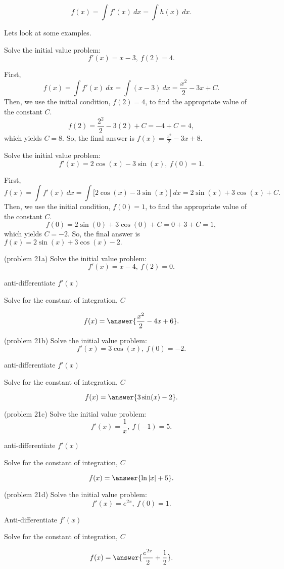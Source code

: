 \documentclass{ximera}
\begin{document}
\[f(x) = \int f'(x) \ dx = \int h(x) \ dx.\]

Lets look at some examples.

\begin{example}[example 20]
Solve the initial value problem:
\[f'(x) = x - 3, \ f(2) = 4.\]

First, 
\[f(x) = \int f'(x) \ dx = \int (x-3)  \ dx = \frac{x^2}{2} - 3x + C.\]
Then, we use the initial condition, $f(2) = 4$, to find the 
appropriate value of the constant $C$.
\[f(2) = \frac{2^2}{2} - 3(2) + C = -4 + C = 4,\]
which yields $C = 8$.
So, the final answer is  $f(x) = \frac{x^2}{2} -3x + 8.$
\end{example}

\begin{example}[example 21]
Solve the initial value problem:
\[f'(x) = 2\cos(x) -3\sin(x), \ f(0) = 1.\]

First, 
\[f(x) = \int f'(x) \ dx = \int \big[2\cos(x) -3\sin(x)\big]  \ dx =
 2\sin(x) + 3\cos(x) + C.\]
Then, we use the initial condition, $f(0) = 1$, to find the 
appropriate value of the constant $C$.
\[f(0) = 2\sin(0) + 3\cos(0) + C = 0 + 3 + C = 1,\]
which yields $C = -2$.
So, the final answer is  $f(x) = 2\sin(x) + 3\cos(x)-2.$
\end{example}

\begin{problem}(problem 21a)
Solve the initial value problem:
\[f'(x) = x-4, \ f(2) = 0.\]
\begin{hint}
anti-differentiate $f'(x)$
\end{hint}
\begin{hint}
Solve for the constant of integration, $C$
\end{hint}
\[f(x) = \answer{\frac{x^2}{2} - 4x + 6}.\]
\end{problem}

\begin{problem}(problem 21b)
Solve the initial value problem:
\[f'(x) = 3\cos(x), \ f(0) = -2.\]
\begin{hint}
anti-differentiate $f'(x)$
\end{hint}
\begin{hint}
Solve for the constant of integration, $C$
\end{hint}
\[f(x) = \answer{3\sin(x) - 2}.\]
\end{problem}

\begin{problem}(problem 21c)
Solve the initial value problem:
\[f'(x) = \frac{1}{x}, \ f(-1) = 5.\]
\begin{hint}
anti-differentiate $f'(x)$
\end{hint}
\begin{hint}
Solve for the constant of integration, $C$
\end{hint}
\[f(x) = \answer{\ln|x| + 5}.\]
\end{problem}

\begin{problem}(problem 21d)
Solve the initial value problem:
\[f'(x) = e^{2x}, \ f(0) = 1.\]
\begin{hint}
Anti-differentiate $f'(x)$
\end{hint}
\begin{hint}
Solve for the constant of integration, $C$
\end{hint}
\[f(x) = \answer{\frac{e^{2x}}{2} + \frac12}.\]
\end{problem}
\end{document}

